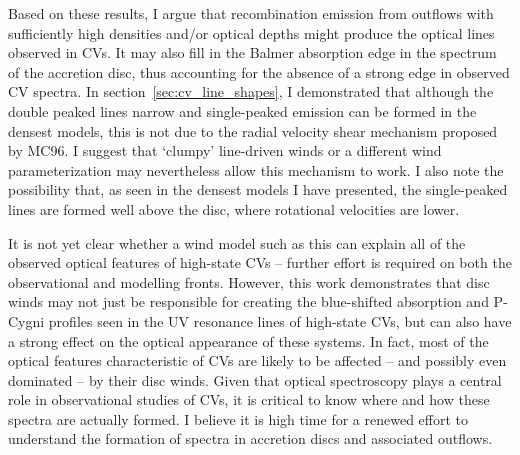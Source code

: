 Based on these results, I argue that recombination emission 
from outflows with sufficiently high densities and/or optical depths 
might produce the optical lines observed in CVs. It may also 
fill in the Balmer absorption edge in the spectrum of the accretion disc, 
thus accounting for the absence of a strong edge in observed CV spectra.
In section~\ref{sec:cv_line_shapes}, I demonstrated that
although the double peaked lines narrow and 
single-peaked emission can be formed in the densest models, 
this is not due to the radial velocity shear mechanism proposed by MC96.
I suggest that `clumpy' line-driven winds or a different
wind parameterization may nevertheless allow this mechanism to work.
I also note the possibility that, as seen in the densest models I have presented, 
the single-peaked lines are formed well above the disc, where 
rotational velocities are lower.

It is not yet clear whether a wind model such as this can
explain all of the observed optical features of high-state CVs --
further effort is required on both the observational
and modelling fronts. However, this work demonstrates that disc winds may
not just be responsible for creating the blue-shifted absorption and
P-Cygni profiles seen in the UV resonance lines of high-state CVs, but
can also have a strong effect on the optical appearance of these
systems. In fact, most of the optical features characteristic of CVs
are likely to be affected -- and possibly even dominated -- by their disc
winds. Given that optical spectroscopy plays a central role in
observational studies of CVs, it is critical to know 
where and how these spectra are actually formed. I believe it is high
time for a renewed effort to understand the formation of spectra in
accretion discs and associated outflows. 


